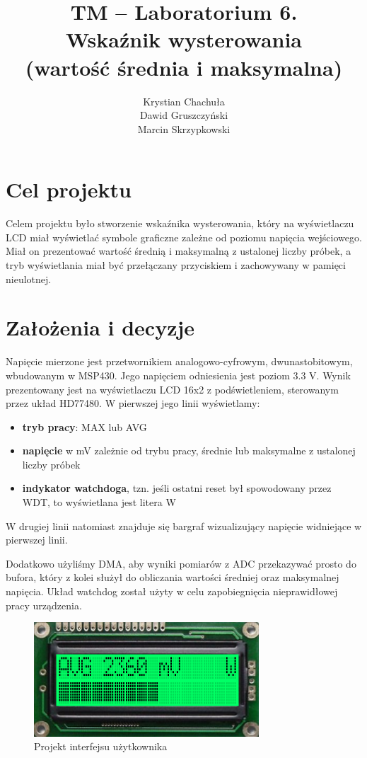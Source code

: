 \documentclass[fleqn]{article}
\title{TM -- Laboratorium 6. \\ \large Wskaźnik wysterowania \\ (wartość średnia i maksymalna)}
\author{Krystian Chachuła \\ Dawid Gruszczyński \\ Marcin Skrzypkowski}
\begin{document}
\maketitle

\setcounter{page}{0}
\thispagestyle{empty}

\pagebreak

\setcounter{page}{1}

\section{Cel projektu}

Celem projektu było stworzenie wskaźnika wysterowania, który na wyświetlaczu LCD miał wyświetlać symbole graficzne zależne od poziomu napięcia wejściowego. Miał on prezentować wartość średnią i maksymalną z ustalonej liczby próbek, a tryb wyświetlania miał być przełączany przyciskiem i zachowywany w pamięci nieulotnej.

\section{Założenia i decyzje}

Napięcie mierzone jest przetwornikiem analogowo-cyfrowym, dwunastobitowym, wbudowanym w MSP430. Jego napięciem odniesienia jest poziom 3.3 V. Wynik prezentowany jest na wyświetlaczu LCD 16x2 z podświetleniem, sterowanym przez układ HD77480. W pierwszej jego linii wyświetlamy:
\begin{itemize}
	\item \textbf{tryb pracy}: MAX lub AVG
	\item \textbf{napięcie} w mV zależnie od trybu pracy, średnie lub maksymalne z ustalonej liczby próbek
	\item \textbf{indykator watchdoga}, tzn. jeśli ostatni reset był spowodowany przez WDT, to wyświetlana jest litera W
\end{itemize}
W drugiej linii natomiast znajduje się bargraf wizualizujący napięcie widniejące w pierwszej linii.

Dodatkowo użyliśmy DMA, aby wyniki pomiarów z ADC przekazywać prosto do bufora, który z kolei służył do obliczania wartości średniej oraz maksymalnej napięcia. Układ watchdog został użyty w celu zapobiegnięcia nieprawidłowej pracy urządzenia. 

\begin{figure}[H]
	\centering
	\includegraphics[width=0.75\textwidth]{img/ui.png}
	\caption{Projekt interfejsu użytkownika}
\end{figure}
\end{document}
